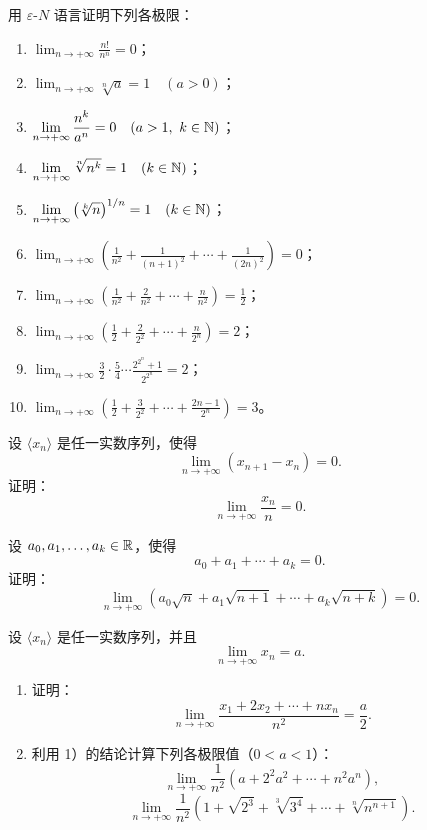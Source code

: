 \begin{exercise}
  \item 用 \(\varepsilon\)-\(N\) 语言证明下列各极限：
  \begin{enumerate}[label=\arabic*)]
    \item \(\displaystyle\lim_{n\to+\infty}\frac{n!}{n^n}=0\)；
    \item \(\displaystyle\lim_{n\to+\infty}\sqrt[n]{a}=1\quad(a>0)\)；
    \item \(\displaystyle\lim_{n\to+\infty}\frac{n^k}{a^n}=0
      \quad(a>1,\ k\in\mathbb{N})\)；
    \item \(\displaystyle\lim_{n\to+\infty}\sqrt[n]{n^k}=1
      \quad(k\in\mathbb{N})\)；
    \item \(\displaystyle\lim_{n\to+\infty}\left(\sqrt[k]{n}\right)^{1/n}=1
      \quad(k\in\mathbb{N})\)；
    \item \(\displaystyle\lim_{n\to+\infty}
      \left(\frac1{n^2}+\frac1{(n+1)^2}+\cdots+\frac1{(2n)^2}\right)=0\)；
    \item \(\displaystyle\lim_{n\to+\infty}
      \left(\frac1{n^2}+\frac2{n^2}+\cdots+\frac n{n^2}\right)=\frac12\)；
    \item \(\displaystyle\lim_{n\to+\infty}
      \left(\frac12+\frac2{2^2}+\cdots+\frac n{2^n}\right)=2\)；
    \item \(\displaystyle\lim_{n\to+\infty}
      \frac32\cdot\frac54\cdots
      \frac{2^{2^n}+1}{2^{2^n}}=2\)；
    \item \(\displaystyle\lim_{n\to+\infty}
      \left(\frac12+\frac3{2^2}+\cdots+\frac{2n-1}{2^n}\right)=3\)。
  \end{enumerate}
\end{exercise}

\begin{exercise}
  \item 设 \(\langle x_n\rangle\) 是任一实数序列，使得
  \[
  \lim_{n\to+\infty}(x_{n+1}-x_n)=0.
  \]
  证明：
  \[
  \lim_{n\to+\infty}\frac{x_n}{n}=0.
  \]
\end{exercise}

\begin{exercise}
  \item 设 \(a_0,a_1,\ldots,a_k\in\mathbb{R}\)，使得
  \[
  a_0+a_1+\cdots+a_k=0.
  \]
  证明：
  \[
  \lim_{n\to+\infty}
  \left(a_0\sqrt n+a_1\sqrt{n+1}+\cdots+a_k\sqrt{n+k}\right)=0.
  \]
\end{exercise}

\begin{exercise}
  \item 设 \(\langle x_n\rangle\) 是任一实数序列，并且
  \[
  \lim_{n\to+\infty}x_n=a.
  \]
  \begin{enumerate}[label=\arabic*)]
    \item 证明：
    \[
    \lim_{n\to+\infty}\frac{x_1+2x_2+\cdots+nx_n}{n^2}=\frac a2.
    \]
    \item 利用 1）的结论计算下列各极限值（\(0<a<1\)）：
    \[
    \lim_{n\to+\infty}
    \frac1{n^2}\left(a+2^2a^2+\cdots+n^2a^n\right),
    \]
    \[
    \lim_{n\to+\infty}
    \frac1{n^2}\left(1+\sqrt{2^3}+\sqrt[3]{3^4}
    +\cdots+\sqrt[n]{n^{n+1}}\right).
    \]
  \end{enumerate}
\end{exercise}

